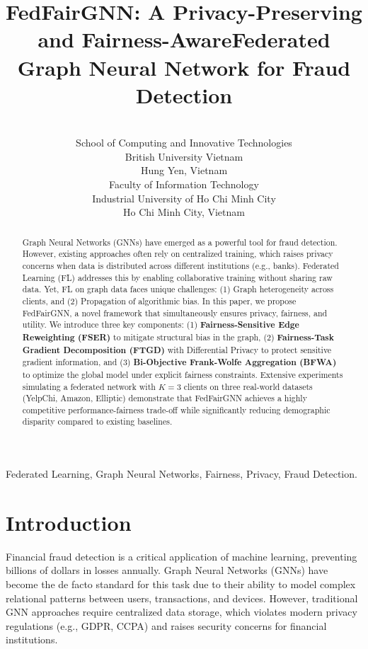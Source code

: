 \documentclass[pmlr]{jmlr}%
\title[FedFairGNN]{FedFairGNN: A Privacy-Preserving and Fairness-Aware\titlebreak Federated Graph Neural Network for Fraud Detection}
\author{\Name{Quang-Vinh Dang} \Email{vinh.dq4@buv.edu.vn}\\
\addr School of Computing and Innovative Technologies\\
British University Vietnam\\
Hung Yen, Vietnam
\AND
\Name{Ngoc-Son-An Nguyen} \Email{annns25871@pgr.iuh.edu.vn}\\
\addr Faculty of Information Technology\\
Industrial University of Ho Chi Minh City\\
Ho Chi Minh City, Vietnam
}
\begin{document}

\maketitle

\begin{abstract}
Graph Neural Networks (GNNs) have emerged as a powerful tool for fraud detection. However, existing approaches often rely on centralized training, which raises privacy concerns when data is distributed across different institutions (e.g., banks). Federated Learning (FL) addresses this by enabling collaborative training without sharing raw data. Yet, FL on graph data faces unique challenges: (1) Graph heterogeneity across clients, and (2) Propagation of algorithmic bias. In this paper, we propose FedFairGNN, a novel framework that simultaneously ensures privacy, fairness, and utility. We introduce three key components: (1) \textbf{Fairness-Sensitive Edge Reweighting (FSER)} to mitigate structural bias in the graph, (2) \textbf{Fairness-Task Gradient Decomposition (FTGD)} with Differential Privacy to protect sensitive gradient information, and (3) \textbf{Bi-Objective Frank-Wolfe Aggregation (BFWA)} to optimize the global model under explicit fairness constraints. Extensive experiments simulating a federated network with $K=3$ clients on three real-world datasets (YelpChi, Amazon, Elliptic) demonstrate that FedFairGNN achieves a highly competitive performance-fairness trade-off while significantly reducing demographic disparity compared to existing baselines.
\end{abstract}

\begin{keywords}
Federated Learning, Graph Neural Networks, Fairness, Privacy, Fraud Detection.
\end{keywords}

\section{Introduction}
\label{sec:intro}

Financial fraud detection is a critical application of machine learning, preventing billions of dollars in losses annually. Graph Neural Networks (GNNs) have become the de facto standard for this task due to their ability to model complex relational patterns between users, transactions, and devices. However, traditional GNN approaches require centralized data storage, which violates modern privacy regulations (e.g., GDPR, CCPA) and raises security concerns for financial institutions.
\end{document}
